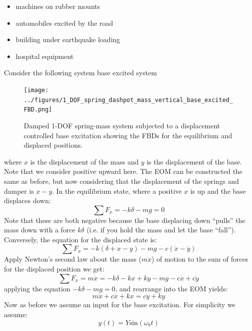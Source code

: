 \documentclass[12pt,letter]{article}
\numberwithin{ex}{section} %
\numberwithin{re}{section} %
\begin{document}
			\begin{itemize}
			\item machines on rubber mounts
			\item automobiles excited by the road
			\item building under earthquake loading
			\item hospital equipment
			\end{itemize}
			
			Consider the following system base excited system
			\begin{figure}[H]
				\centering
				\texttt{[image: ../figures/1\_DOF\_spring\_dashpot\_mass\_vertical\_base\_excited\_FBD.png]}
				\caption{Damped 1-DOF spring-mass system subjected to a displacement controlled base excitation showing the FBDs for the equilibrium and displaced positions.}
				\label{fig:1_DOF_spring_dashpot_mass_vertical_base_excited_FBD}
			\end{figure}
			where $x$ is the displacement of the mass and $y$ is the displacement of the base. Note that we consider positive upward here. The EOM can be constructed the same as before, but now considering that the displacement of the springs and damper is $x-y$.  In the equilibrium state, where a positive $x$ is up and the base displaces down:
			\begin{equation}
			\sum F_x = -k\delta -mg =0
			\end{equation}	
			Note that these are both negative because the base displacing down ``pulls'' the mass down with a force $k\delta$ (i.e. if you hold the mass and let the base ``fall''). Conversely, the equation for the displaced state is:
			\begin{equation}
			\sum F_x = -k(\delta + x - y) -mg -c(\dot{x} -\dot{y})
			\end{equation}	
			Apply Newton's second law about the mass ($m\ddot{x}$) of motion to the sum of forces for the displaced position we get:
			\begin{equation}
			\sum F_x = m\ddot{x} = -k\delta -kx + ky -mg -c\dot{x} +c\dot{y}
			\end{equation}	
			applying the equation $-k\delta -mg =0$, and rearrange into the EOM yields:	
			\begin{equation}
			m\ddot{x} + c\dot{x} + kx = c\dot{y} + ky 
			\end{equation}
			Now as before we assume an input for the base excitation. For simplicity we assume:
			\begin{equation}
			y(t) = Y\text{sin}(\omega_b t)
			\end{equation}
\end{document}
